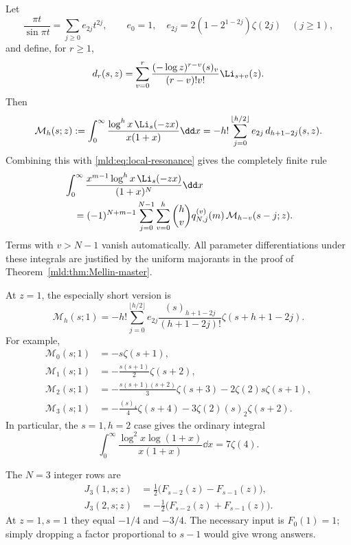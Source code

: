 Let
\[
 \frac{\pi t}{\sin\pi t}=\sum_{j\ge0}e_{2j}t^{2j},\qquad
 e_0=1,\quad e_{2j}=2(1-2^{1-2j})\zeta(2j)\quad(j\ge1),
\]
and define, for $r\ge1$,
\begin{equation}\label{mld:eq:dr}
 d_r(s,z)=\sum_{v=0}^{r}
       \frac{(-\log z)^{r-v}(s)_v}{(r-v)!v!}\Li_{s+v}(z).
\end{equation}
Then
\begin{equation}\label{mld:eq:M-moments}
 \mathcal M_h(s;z):=\int_0^\infty
       \frac{\log^h x\,\Li_s(-zx)}{x(1+x)}\dd x
 =-h!\sum_{j=0}^{\lfloor h/2\rfloor}e_{2j}\,d_{h+1-2j}(s,z).
\end{equation}
Combining this with \eqref{mld:eq:local-resonance} gives the completely finite rule
\begin{align}\label{mld:eq:all-integer-moments}
 &\int_0^\infty\frac{x^{m-1}\log^h x\,\Li_s(-zx)}{(1+x)^N}\dd x\notag\\
 &\quad=(-1)^{N+m-1}
   \sum_{j=0}^{N-1}\sum_{v=0}^{h}\binom hv
           q_{N,j}^{(v)}(m)\,\mathcal M_{h-v}(s-j;z).
\end{align}
Terms with $v>N-1$ vanish automatically. All parameter differentiations under these integrals are justified by the uniform majorants in the proof of Theorem~\ref{mld:thm:Mellin-master}.

At $z=1$, the especially short version is
\begin{equation}\label{mld:eq:unit-moments}
 \boxed{\displaystyle
 \mathcal M_h(s;1)=-h!\sum_{j=0}^{\lfloor h/2\rfloor}
   e_{2j}\frac{(s)_{h+1-2j}}{(h+1-2j)!}
                      \zeta(s+h+1-2j).}
\end{equation}
For example,
\begin{align*}
 \mathcal M_0(s;1)&=-s\zeta(s+1),\\
 \mathcal M_1(s;1)&=-\frac{s(s+1)}2\zeta(s+2),\\
 \mathcal M_2(s;1)&=-\frac{s(s+1)(s+2)}3\zeta(s+3)
                          -2\zeta(2)s\zeta(s+1),\\
 \mathcal M_3(s;1)&=-\frac{(s)_4}{4}\zeta(s+4)
                          -3\zeta(2)(s)_2\zeta(s+2).
\end{align*}
In particular, the $s=1,h=2$ case gives the ordinary integral
\[
 \int_0^\infty\frac{\log^2x\log(1+x)}{x(1+x)}\dd x=7\zeta(4).
\]

\begin{example}
The $N=3$ integer rows are
\begin{align*}
 J_3(1,s;z)&=\tfrac12\big(F_{s-2}(z)-F_{s-1}(z)\big),\\
 J_3(2,s;z)&=-\tfrac12\big(F_{s-2}(z)+F_{s-1}(z)\big).
\end{align*}
At $z=1,s=1$ they equal $-1/4$ and $-3/4$. The necessary input is $F_0(1)=1$; simply dropping a factor proportional to $s-1$ would give wrong answers.
\end{example}

